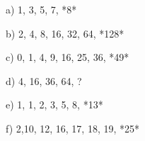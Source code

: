 
a) 1, 3, 5, 7, *8*

b) 2, 4, 8, 16, 32, 64, *128*  

c) 0, 1, 4, 9, 16, 25, 36, *49*  

d) 4, 16, 36, 64, ?  

e) 1, 1, 2, 3, 5, 8, *13*  

f) 2,10, 12, 16, 17, 18, 19, *25*
